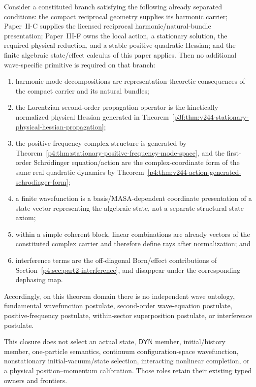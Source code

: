 \documentclass[12pt,a4paper]{article}
\begin{document}
\begin{theorem}
\label{p4:thm:v244-no-independent-wave-postulate}
Consider a constituted branch satisfying the following already separated
conditions: the compact reciprocal geometry supplies its harmonic carrier;
Paper~II-C supplies the licensed reciprocal harmonic/natural-bundle
presentation; Paper~III-F owns the local action, a stationary solution, the
required physical reduction, and a stable positive quadratic Hessian; and the
finite algebraic state/effect calculus of this paper applies.  Then no
additional wave-specific primitive is required on that branch:
\begin{enumerate}[label=(\roman*),leftmargin=2.2em]
\item harmonic mode decompositions are representation-theoretic consequences
of the compact carrier and its natural bundles;
\item the Lorentzian second-order propagation operator is the kinetically
normalized physical Hessian generated in
Theorem~\ref{p3f:thm:v244-stationary-physical-hessian-propagation};
\item the positive-frequency complex structure is generated by
Theorem~\ref{p4:thm:stationary-positive-frequency-mode-space}, and the
first-order Schr\"odinger equation/action are the complex-coordinate form of
the same real quadratic dynamics by
Theorem~\ref{p4:thm:v244-action-generated-schrodinger-form};
\item a finite wavefunction is a basis/MASA-dependent coordinate presentation
of a state vector representing the algebraic state, not a separate structural
state axiom;
\item within a simple coherent block, linear combinations are already vectors
of the constituted complex carrier and therefore define rays after
normalization; and
\item interference terms are the off-diagonal Born/effect contributions of
Section~\ref{p4:sec:part2-interference}, and disappear under the corresponding
dephasing map.
\end{enumerate}
Accordingly, on this theorem domain there is no independent wave ontology,
fundamental wavefunction postulate, second-order wave-equation postulate,
positive-frequency postulate, within-sector superposition postulate, or
interference postulate.

This closure does not select an actual state, \(\mathsf{DYN}\) member,
initial/history member, one-particle semantics, continuum configuration-space
wavefunction, nonstationary initial-vacuum/state selection, interacting nonlinear
completion, or a physical position--momentum calibration.  Those roles retain
their existing typed owners and frontiers.
\end{theorem}
\end{document}
